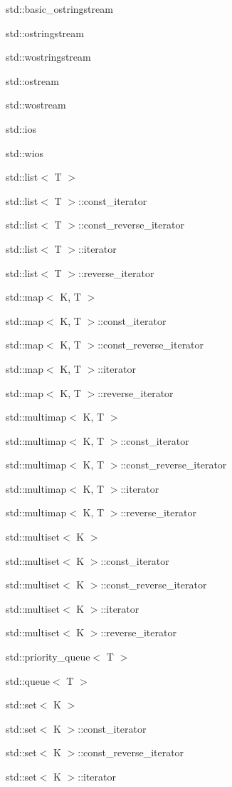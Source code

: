 \begin{DoxyCompactList}
\begin{DoxyCompactList}
\begin{DoxyCompactList}
\begin{DoxyCompactList}
\item std\+:\+:basic\+\_\+ostringstream\begin{DoxyCompactList}
\item std\+:\+:ostringstream\item std\+:\+:wostringstream\end{DoxyCompactList}
\item std\+:\+:ostream\item std\+:\+:wostream\end{DoxyCompactList}
\item std\+:\+:ios\item std\+:\+:wios\end{DoxyCompactList}
\end{DoxyCompactList}
\item std\+:\+:list$<$ T $>$\item std\+:\+:list$<$ T $>$\+:\+:const\+\_\+iterator\item std\+:\+:list$<$ T $>$\+:\+:const\+\_\+reverse\+\_\+iterator\item std\+:\+:list$<$ T $>$\+:\+:iterator\item std\+:\+:list$<$ T $>$\+:\+:reverse\+\_\+iterator\item std\+:\+:map$<$ K, T $>$\item std\+:\+:map$<$ K, T $>$\+:\+:const\+\_\+iterator\item std\+:\+:map$<$ K, T $>$\+:\+:const\+\_\+reverse\+\_\+iterator\item std\+:\+:map$<$ K, T $>$\+:\+:iterator\item std\+:\+:map$<$ K, T $>$\+:\+:reverse\+\_\+iterator\item std\+:\+:multimap$<$ K, T $>$\item std\+:\+:multimap$<$ K, T $>$\+:\+:const\+\_\+iterator\item std\+:\+:multimap$<$ K, T $>$\+:\+:const\+\_\+reverse\+\_\+iterator\item std\+:\+:multimap$<$ K, T $>$\+:\+:iterator\item std\+:\+:multimap$<$ K, T $>$\+:\+:reverse\+\_\+iterator\item std\+:\+:multiset$<$ K $>$\item std\+:\+:multiset$<$ K $>$\+:\+:const\+\_\+iterator\item std\+:\+:multiset$<$ K $>$\+:\+:const\+\_\+reverse\+\_\+iterator\item std\+:\+:multiset$<$ K $>$\+:\+:iterator\item std\+:\+:multiset$<$ K $>$\+:\+:reverse\+\_\+iterator\item std\+:\+:priority\+\_\+queue$<$ T $>$\item std\+:\+:queue$<$ T $>$\item std\+:\+:set$<$ K $>$\item std\+:\+:set$<$ K $>$\+:\+:const\+\_\+iterator\item std\+:\+:set$<$ K $>$\+:\+:const\+\_\+reverse\+\_\+iterator\item std\+:\+:set$<$ K $>$\+:\+:iterator\item 
\end{DoxyCompactList}
